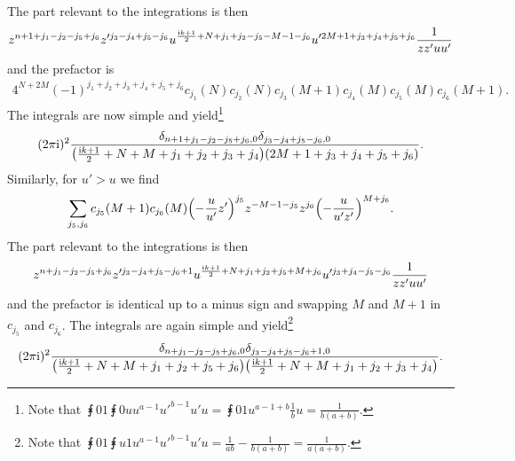 \documentclass[english, parskip=full]{scrartcl}
\begin{document}
The part relevant to the integrations is then
\begin{align}
z^{n+1+j_1-j_2-j_5 + j_6} z'^{j_3-j_4+j_5-j_6} u^{\frac{\text{i} k + 1}{2} + N+j_1+j_2-j_5-M-1-j_6} u'^{2M+1+j_3+j_4+j_5+j_6} \frac{1}{zz'uu'}
\end{align}
and the prefactor is
\begin{align}
4^{N+2M} (-1)^{j_1+j_2+j_3+j_4+j_5+j_6} c_{j_1}(N) c_{j_2}(N) c_{j_3}(M+1) c_{j_4}(M) c_{j_5}(M) c_{j_6}(M+1).
\end{align}
The integrals are now simple and yield\footnote{Note that $\intx{0}{1}{\intx{0}{u}{u^{a-1} u'^{b-1}}{u'}}{u} = \intx{0}{1}{u^{a-1+b} \frac{1}{b}}{u} = \frac{1}{b(a+b)}$.}
\begin{align}
(2\pi\i)^2 \frac{\delta_{n+1+j_1-j_2-j_5+j_6,0} \delta_{j_3-j_4+j_5-j_6,0}}{\kla*{\frac{\i k + 1}{2} + N+M+j_1+j_2+j_3+j_4} \kla*{2M+1+j_3+j_4+j_5+j_6}}.
\end{align}
Similarly, for $u'>u$ we find
\begin{align}
\sum_{j_5,j_6} c_{j_5}(M+1) c_{j_6}(M) \kla*{-\frac{u}{u'}z'}^{j_5} z^{-M-1-j_5} z^{j_6} \kla*{-\frac{u}{u'z'}}^{M+j_6}.
\end{align}
The part relevant to the integrations is then
\begin{align}
z^{n+j_1-j_2-j_5 + j_6} z'^{j_3-j_4+j_5-j_6+1} u^{\frac{\text{i} k + 1}{2} + N+j_1+j_2+j_5+M+j_6} u'^{j_3+j_4-j_5-j_6} \frac{1}{zz'uu'}
\end{align}
and the prefactor is identical up to a minus sign and swapping $M$ and $M+1$ in $c_{j_5}$ and $c_{j_6}$.
The integrals are again simple and yield\footnote{Note that $\intx{0}{1}{\intx{u}{1}{u^{a-1} u'^{b-1}}{u'}}{u} =\frac{1}{ab}- \frac{1}{b(a+b)} = \frac{1}{a(a+b)}$.}
\begin{align}
(2\pi\i)^2 \frac{\delta_{n+j_1-j_2-j_5+j_6,0} \delta_{j_3-j_4+j_5-j_6+1,0}}{\kla*{\frac{\i k + 1}{2} + N+M+j_1+j_2+j_5+j_6} \kla*{\frac{\i k + 1}{2} + N+M+j_1+j_2+j_3+j_4}}.
\end{align}
\end{document}
